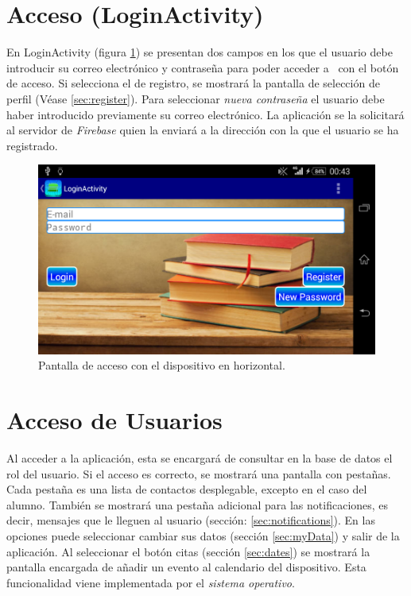 	\section{Acceso ({\ttfamily LoginActivity})} \label{sec:login}
		
		En {\ttfamily LoginActivity} (figura \ref{fig:loginLand}) se presentan dos campos en los que el usuario debe introducir su correo electrónico y contraseña para poder acceder a \CollegeApp\ con el botón de acceso. Si selecciona el de registro, se mostrará la pantalla de selección de perfil (Véase \ref{sec:register}). Para seleccionar {\it nueva contraseña} el usuario debe haber introducido previamente su correo electrónico. La aplicación se la solicitará al servidor de {\it Firebase} quien la enviará a la dirección con la que el usuario se ha registrado.
		
		\begin{figure}[h !]
			\centering
			\includegraphics[scale=0.3]{Imagenes/App/loginLand}
			\caption{Pantalla de acceso con el dispositivo en horizontal.}
			\label{fig:loginLand}
		\end{figure}
	
	\section{Acceso de Usuarios}
	
		Al acceder a la aplicación, esta se encargará de consultar en la base de datos el rol del usuario. Si el acceso es correcto, se mostrará una pantalla con pestañas. Cada pestaña es una lista de contactos desplegable, excepto en el caso del alumno. También se mostrará una pestaña adicional para las notificaciones, es decir, mensajes que le lleguen al usuario (sección: \ref{sec:notifications}). En las opciones puede seleccionar cambiar sus datos (sección \ref{sec:myData}) y salir de la aplicación.
		Al seleccionar el botón citas (sección \ref{sec:dates}) se mostrará la pantalla encargada de añadir un evento al calendario del dispositivo. Esta funcionalidad viene implementada por el {\it sistema operativo}.
		
